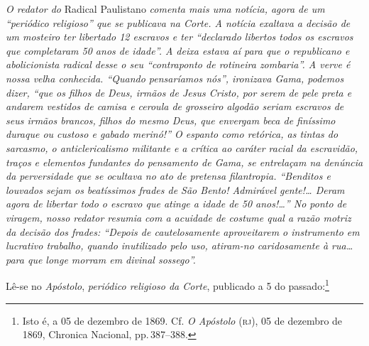 \begin{didascalia}
\emph{O redator do} Radical Paulistano \emph{comenta mais uma notícia,
agora de um ``periódico religioso'' que se publicava na Corte. A notícia
exaltava a decisão de um mosteiro ter libertado 12 escravos e ter
``declarado libertos todos os escravos que completaram 50 anos de idade''.
A deixa estava aí para que o republicano e abolicionista radical desse o
seu ``contraponto de rotineira zombaria''. A verve é nossa velha
conhecida. ``Quando pensaríamos nós'', ironizava Gama, podemos dizer, ``que
os filhos de Deus, irmãos de Jesus Cristo, por serem de pele preta e
andarem vestidos de camisa e ceroula de grosseiro algodão seriam
escravos de seus irmãos brancos, filhos do mesmo Deus, que envergam beca
de finíssimo duraque ou custoso e gabado merinó!'' O espanto como
retórica, as tintas do sarcasmo, o anticlericalismo militante e a
crítica ao caráter racial da escravidão, traços e elementos fundantes do
pensamento de Gama, se entrelaçam na denúncia da perversidade que se
ocultava no ato de pretensa filantropia. ``Benditos e louvados sejam os
beatíssimos frades de São Bento! Admirável gente!\ldots{} Deram agora de
libertar todo o escravo que atinge a idade de 50 anos!\ldots{}'' No ponto de
viragem, nosso redator resumia com a acuidade de costume qual a razão
motriz da decisão dos frades: ``Depois de cautelosamente aproveitarem o
instrumento em lucrativo trabalho, quando inutilizado pelo uso,
atiram-no caridosamente à rua\ldots{} para que longe morram em divinal
sossego''.}
\end{didascalia}


Lê-se no \emph{Apóstolo}, \emph{periódico religioso da Corte}, publicado
a 5 do passado:\footnote{ Isto é, a 05 de dezembro de 1869. Cf. \emph{O Apóstolo}
  (\textsc{rj}), 05 de dezembro de 1869, Chronica Nacional, pp.\,387--388.}

